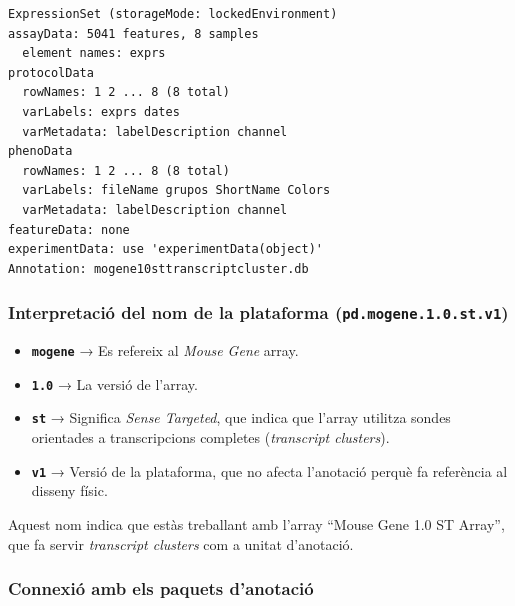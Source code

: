 \documentclass[
]{article}
\newenvironment{Shaded}{\begin{snugshade}}{\end{snugshade}}
\newcommand{\CommentTok}[1]{\textcolor[rgb]{0.56,0.35,0.01}{\textit{#1}}}
\newcommand{\FunctionTok}[1]{\textcolor[rgb]{0.13,0.29,0.53}{\textbf{#1}}}
\newcommand{\NormalTok}[1]{#1}
\newcommand{\SpecialCharTok}[1]{\textcolor[rgb]{0.81,0.36,0.00}{\textbf{#1}}}
\begin{document}
\begin{Shaded}
\end{Shaded}

\begin{verbatim}
ExpressionSet (storageMode: lockedEnvironment)
assayData: 5041 features, 8 samples 
  element names: exprs 
protocolData
  rowNames: 1 2 ... 8 (8 total)
  varLabels: exprs dates
  varMetadata: labelDescription channel
phenoData
  rowNames: 1 2 ... 8 (8 total)
  varLabels: fileName grupos ShortName Colors
  varMetadata: labelDescription channel
featureData: none
experimentData: use 'experimentData(object)'
Annotation: mogene10sttranscriptcluster.db 
\end{verbatim}

\subsubsection{\texorpdfstring{\textbf{Interpretació del nom de la
plataforma
(\texttt{pd.mogene.1.0.st.v1})}}{Interpretació del nom de la plataforma (pd.mogene.1.0.st.v1)}}\label{interpretaciuxf3-del-nom-de-la-plataforma-pd.mogene.1.0.st.v1}

\begin{itemize}
\item
  \textbf{\texttt{mogene}} → Es refereix al \emph{Mouse Gene} array.
\item
  \textbf{\texttt{1.0}} → La versió de l'array.
\item
  \textbf{\texttt{st}} → Significa \emph{Sense Targeted}, que indica que
  l'array utilitza sondes orientades a transcripcions completes
  (\emph{transcript clusters}).
\item
  \textbf{\texttt{v1}} → Versió de la plataforma, que no afecta
  l'anotació perquè fa referència al disseny físic.
\end{itemize}

Aquest nom indica que estàs treballant amb l'array ``Mouse Gene 1.0 ST
Array'', que fa servir \emph{transcript clusters} com a unitat
d'anotació.

\subsubsection{\texorpdfstring{\textbf{Connexió amb els paquets
d'anotació}}{Connexió amb els paquets d'anotació}}\label{connexiuxf3-amb-els-paquets-danotaciuxf3}
\end{document}
